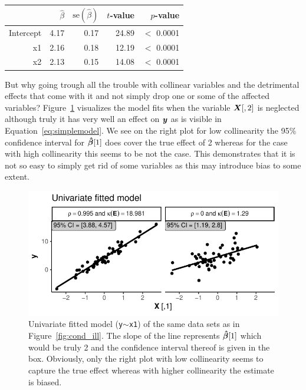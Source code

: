 \documentclass[11pt,a4paper,twoside]{book}\usepackage[]{graphicx}\usepackage[]{xcolor}
\makeatletter
\def\maxwidth{ %
  \ifdim\Gin@nat@width>\linewidth
    \linewidth
  \else
    \Gin@nat@width
  \fi
}
\newenvironment{knitrout}{}{} %
\makeatother
\begin{document}
\begin{table}[H]
\begin{subtable}[h]{0.45\textwidth}
\end{subtable}
\centering
\begin{subtable}[h]{0.45\textwidth}
\vspace{0.2cm}
\begingroup\footnotesize
\begin{tabular}{rrrrr}
  \toprule
 & $\hat\beta$ & $\text{se}\left(\hat\beta\right)$ & $t$-value & $p$-value \\ 
  \midrule
Intercept & 4.17 & 0.17 & 24.89 & $<$ 0.0001 \\ 
  x1 & 2.16 & 0.18 & 12.19 & $<$ 0.0001 \\ 
  x2 & 2.13 & 0.15 & 14.08 & $<$ 0.0001 \\ 
   \bottomrule
\end{tabular}
\endgroup

\end{subtable}
\end{table}


But why going trough all the trouble with collinear variables and the detrimental effects that come with it and not simply drop one or some of the affected variables? Figure~\ref{fig:coll2} visualizes the model fits when the variable ${\boldsymbol{X}}[,2]$ is neglected although truly it has very well an effect on ${\textbf{\textit{y}}}$ as is visible in Equation~\eqref{eq:simplemodel}. We see on the right plot for low collinearity the 95\% confidence interval for ${\boldsymbol{\hat\beta}}[1]$ does cover the true effect of 2 whereas for the case with high collinearity this seems to be not the case.
This demonstrates that it is not so easy to simply get rid of some variables as this may introduce bias to some extent.

\begin{figure}[h]%
\centering
\begin{knitrout}
\color{fgcolor}
\includegraphics[width=\maxwidth]{figure/ch02_figcoll2-1} 
\end{knitrout}
\vspace{-5mm}
\caption{Univariate fitted model (\texttt{y$\sim$x1}) of the same data sets as in Figure~\ref{fig:cond_ill}. The slope of the line represents ${\boldsymbol{\hat\beta}}[1]$ which would be truly 2 and the confidence interval thereof is given in the box. Obviously, only the right plot with low collinearity seems to capture the true effect whereas with higher collinearity the estimate is biased.}\label{fig:coll2}
\end{figure}
\end{document}
